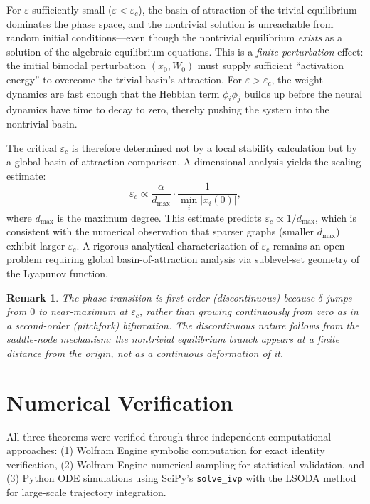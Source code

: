 \documentclass[3p]{elsarticle}
\newtheorem{remark}{Remark}
\begin{document}
For $\varepsilon$ sufficiently small ($\varepsilon < \varepsilon_c$), the basin of attraction of the trivial equilibrium dominates the phase space, and the nontrivial solution is unreachable from random initial conditions---even though the nontrivial equilibrium \emph{exists} as a solution of the algebraic equilibrium equations. This is a \emph{finite-perturbation} effect: the initial bimodal perturbation $(x_0,W_0)$ must supply sufficient ``activation energy'' to overcome the trivial basin's attraction. For $\varepsilon > \varepsilon_c$, the weight dynamics are fast enough that the Hebbian term $\phi_i\phi_j$ builds up before the neural dynamics have time to decay to zero, thereby pushing the system into the nontrivial basin.

The critical $\varepsilon_c$ is therefore determined not by a local stability calculation but by a global basin-of-attraction comparison. A dimensional analysis yields the scaling estimate:
\begin{equation}
  \varepsilon_c \propto \frac{\alpha}{d_{\max}} \cdot \frac{1}{\min_i |x_i(0)|},
\end{equation}
where $d_{\max}$ is the maximum degree. This estimate predicts $\varepsilon_c \propto 1/d_{\max}$, which is consistent with the numerical observation that sparser graphs (smaller $d_{\max}$) exhibit larger $\varepsilon_c$. A rigorous analytical characterization of $\varepsilon_c$ remains an open problem requiring global basin-of-attraction analysis via sublevel-set geometry of the Lyapunov function.

\begin{remark}
The phase transition is \emph{first-order} (discontinuous) because $\delta$ jumps from $0$ to near-maximum at $\varepsilon_c$, rather than growing continuously from zero as in a second-order (pitchfork) bifurcation. The discontinuous nature follows from the saddle-node mechanism: the nontrivial equilibrium branch appears at a finite distance from the origin, not as a continuous deformation of it.
\end{remark}

\section{Numerical Verification} \label{sec:numerical}

All three theorems were verified through three independent computational approaches: (1) Wolfram Engine symbolic computation for exact identity verification, (2) Wolfram Engine numerical sampling for statistical validation, and (3) Python ODE simulations using SciPy's \texttt{solve\_ivp} \cite{virtanen2020scipy} with the LSODA method for large-scale trajectory integration.
\end{document}
